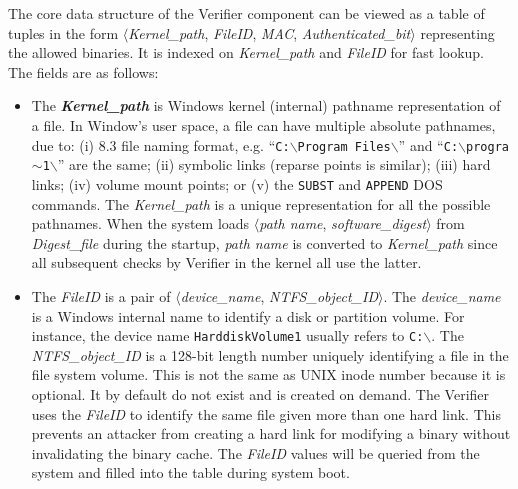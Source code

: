 The core data structure of the Verifier component can be viewed
as a table of tuples in the form
$\langle${\it Kernel\_path}, {\it FileID}, {\it MAC}, 
{\it Authenticated\_bit}$\rangle$
representing the allowed binaries.
It is indexed on {\it Kernel\_path} and {\it FileID} for fast lookup.
The fields are as follows:
\begin{itemize}
\item The {\bf {\it Kernel\_path}} is Windows kernel (internal) pathname 
representation of a file.
In Window's user space, a file can have multiple absolute pathnames, due to:
(i) 8.3 file naming format, e.g.
``{\tt C:\linebreak[0]$\backslash$\linebreak[0]Program Files\linebreak[0]$\backslash$\linebreak[0]}''
and
``{\tt C:\linebreak[0]$\backslash$\linebreak[0]progra$\sim$1\linebreak[0]$\backslash$\linebreak[0]}''
are the same;
(ii) symbolic links (reparse points is similar);
(iii) hard links;
(iv) volume mount points;
or
(v) the {\tt SUBST} and {\tt APPEND} DOS commands.
The {\it Kernel\_path} is a unique representation for all
the possible pathnames.
When the system loads $\langle${\it path name}, {\it software\_digest}$\rangle$ 
from {\it Digest\_file} during the startup, {\it path name} is converted to 
{\it Kernel\_path} since all subsequent checks by Verifier in the kernel 
all use the latter.

\item The {\it FileID} is a pair of $\langle${\it device\_name}, {\it NTFS\_object\_ID}$\rangle$.
The {\it device\_name} is a Windows internal name to identify a 
disk or partition volume.
For instance, the device name {\tt HarddiskVolume1} usually refers to {\tt C:$\backslash$}.
The {\it NTFS\_object\_ID} is a 128-bit length number uniquely identifying
a file in the file system volume.
This is not the same as UNIX inode number because it is optional.
It by default do not exist and is created on demand.
The Verifier uses the {\it FileID} 
to identify the same file given more than one hard link.
This prevents an attacker from creating a hard link for modifying
a binary without invalidating the binary cache.
The {\it FileID} values will be queried from the system and 
filled into the table during system boot.


\end{itemize}
